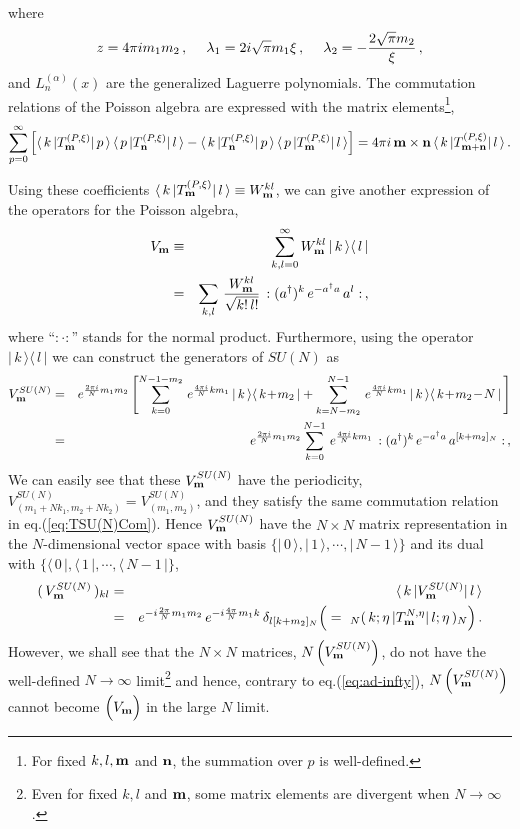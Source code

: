 \documentclass[a4paper,12pt]{article}
\newcommand{\bra}[1]{\langle\,#1\,|}
\newcommand{\ket}[1]{|\,#1\,\rangle}
\newcommand{\Nbra}[1]{~_N(\,#1\,|}
\newcommand{\Nket}[1]{|\,#1\,)_N}
\newcommand{\nn}{\nonumber\\}
\begin{document}
where
\begin{equation}
	z= 4\pi i m_1 m_2\,,\hspace{3ex}
	\lambda_1 = 2i\sqrt{\pi} m_1\xi\,,\hspace{3ex}
	\lambda_2 = - \frac{2\sqrt{\pi} m_2}{\xi}\,,
\end{equation}
and $L_n^{(\alpha)}(x)$ are the generalized Laguerre polynomials.
The commutation relations of the Poisson algebra are expressed with
the matrix elements\footnote{For fixed $k,l,{\bf m}$ and ${\bf n}$,
the summation over $p$ is well-defined.},
\begin{equation}
 \sum_{p=0}^{\infty} \Big[ \bra{k}T^{(P,\xi)}_{\bf m}\ket{p}\,
	\bra{p} T^{(P,\xi)}_{\bf n}\ket{l} -
    \bra{k} T^{(P,\xi)}_{\bf n}\ket{p}\,
	\bra{p} T^{(P,\xi)}_{\bf m}\ket{l}\Big]
    =  4\pi i\,{\bf m\times n}\,\bra{k} T^{(P,\xi)}_{\bf m+n} \ket{l}\,.
\end{equation}

Using these coefficients $\bra{k}T^{(P,\xi)}_{\bf m}\ket{l} \equiv
W_{\bf m}^{kl}$, we can give another expression of the operators for
the Poisson algebra,
\begin{eqnarray}
  V_{\bf m} &\equiv& \sum_{k,l=0}^{\infty}
	W_{\bf m}^{kl}\,\ket{k}\bra{l}\nn
  &=&  \sum_{k,l}\,\frac{W_{\bf m}^{kl}}{\sqrt{k!\,l!}}\,
	:(a^\dagger)^k\,e^{-a^\dagger a}\,a^l: \,, \label{eq:V_m}
\end{eqnarray}
where ``$:\cdot :$'' stands for the normal product.
Furthermore, using the operator $\ket{k}\bra{l}$ we can construct the
generators of $SU(N)$ as
\begin{eqnarray}
  V_{\bf m}^{SU(N)} &=& e^{\frac{2\pi i}{N}m_1m_2}\left[
	\sum_{k=0}^{N-1-m_2}\,e^{\frac{4\pi i}{N}km_1}\,
	\ket{k}\bra{k\!+\!m_2}
    + \sum_{k=N-m_2}^{N-1}\,e^{\frac{4\pi i}{N}km_1}\,
	\ket{k}\bra{k\!+\!m_2\!-\!N}\,\right]\nn
  &=& e^{\frac{2\pi i}{N}m_1m_2}\sum_{k=0}^{N-1}\,
	e^{\frac{4\pi i}{N}km_1}\, :(a^\dagger)^k\,e^{-a^\dagger a}
	\, a^{[k+m_2]_N}:\,,
\end{eqnarray}
We can easily see that these $V_{\bf m}^{SU(N)}$ have the periodicity,
$V_{(m_1+Nk_1,m_2+Nk_2)}^{SU(N)}= V_{(m_1,m_2)}^{SU(N)}$, and they
satisfy the same commutation relation in eq.(\ref{eq:TSU(N)Com}).
Hence $V_{\bf m}^{SU(N)}$ have the $N\times N$ matrix representation
in the $N$-dimensional vector space with basis
$\{\ket{0},\ket{1},\cdots,\ket{N\!-\!1}\}$ and its dual with
$\{\bra{0},\bra{1},\cdots,\bra{N\!-\!1}\}$,
\begin{eqnarray}
  (\,V_{\bf m}^{SU(N)}\,)_{kl} &=& \bra{k}V_{\bf m}^{SU(N)}\ket{l}
	\nn
  &=& e^{-i\frac{2\pi}{N}m_1m_2}\,e^{-i\frac{4\pi}{N}m_1k}\,
	\delta_{l[k+m_2]_N}
 \Big(= \Nbra{k;\eta} T^{N,\eta}_{\bf m}\Nket{l;\eta}\Big)
	\,.\label{eq:SuNmtrxele}
\end{eqnarray}
However, we shall see that the $N\times N$ matrices, $N \left( V_{\bf
m}^{SU(N)} \right)$, do not have the well-defined $N\rightarrow\infty$
limit\footnote{Even for fixed $k,l$ and ${\bf m}$, some matrix
elements are divergent when $N\to\infty$.} and hence, contrary
to eq.(\ref{eq:ad-infty}), $N \left(V_{\bf m}^{SU(N)}\right)$ cannot
become $\Big(V_{\bf m}\Big)$ in the large $N$ limit.
\end{document}
